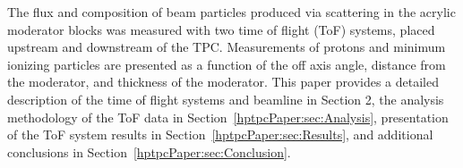The flux and composition of beam particles produced via scattering in the acrylic moderator blocks was measured with two time of flight (ToF) systems, placed upstream and downstream of the TPC.
Measurements of protons and minimum ionizing particles are presented as a function of the off axis angle, distance from the moderator, and thickness of the moderator.
This paper provides a detailed description of the time of flight systems and beamline in Section 2,  the analysis methodology of the ToF data in Section~\ref{hptpcPaper:sec:Analysis}, presentation of the ToF system results in Section~\ref{hptpcPaper:sec:Results}, and additional conclusions in Section~\ref{hptpcPaper:sec:Conclusion}.
